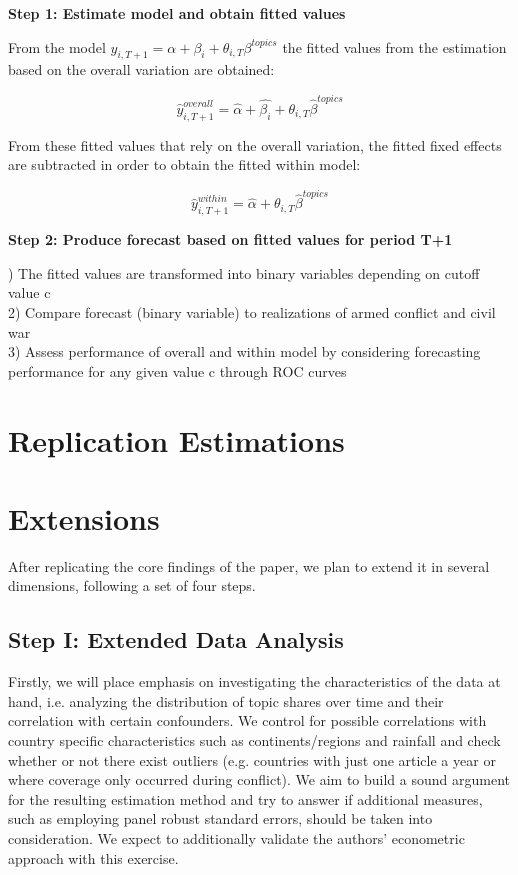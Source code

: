 \noindent\textbf{Step 1: Estimate model and obtain fitted values}

\noindent From the model $y_{i,T+1} = \alpha + \beta_{i} + \theta_{i,T}\beta^{topics}$ the fitted values from the estimation based on the overall variation are obtained: 

\begin{equation}
    \hat{y}_{i,T+1}^{overall} = \hat{\alpha} + \hat{\beta_i} + \theta_{i,T}\hat{\beta}^{topics}
\end{equation}

\noindent From these fitted values that rely on the overall variation, the fitted fixed effects are subtracted in order to obtain the fitted within model:

\begin{equation}
    \hat{y}_{i,T+1}^{within} = \hat{\alpha} + \theta_{i,T}\hat{\beta}^{topics}
\end{equation}

\noindent \textbf{Step 2: Produce forecast based on fitted values for period T+1}

) The fitted values are transformed into binary variables depending on cutoff value c\\
2) Compare forecast (binary variable) to realizations of armed conflict and civil war\\
3) Assess performance of overall and within model by considering forecasting performance for any given value c through ROC curves 

\section{Replication Estimations}


\section{Extensions}
After replicating the core findings of the paper, we plan to extend it in several dimensions, following a set of four steps. 

\subsection{Step I: Extended Data Analysis}
Firstly, we will place emphasis on investigating the characteristics of the data at hand, i.e. analyzing the distribution of topic shares over time and their correlation with certain confounders. We control for possible correlations with country specific characteristics such as continents/regions and rainfall and check whether or not there exist outliers (e.g. countries with just one article a year or where coverage only occurred during conflict). We aim to build a sound argument for the resulting estimation method and try to answer if additional measures, such as employing panel robust standard errors, %
should be taken into consideration. We expect to additionally validate the authors' econometric approach with this exercise. 

